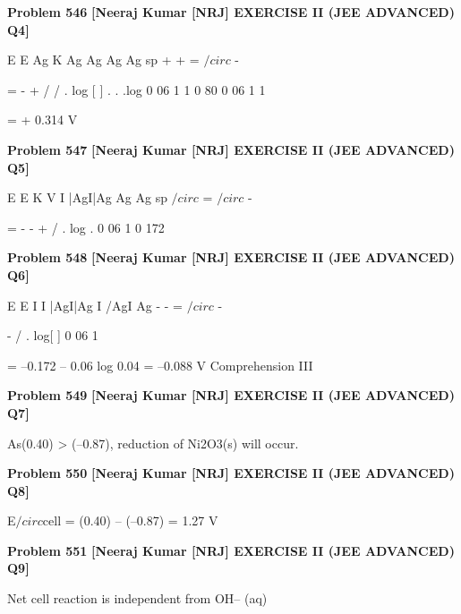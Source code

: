 \begin{problembox}
\textbf{Problem 546} \hfill \textbf{[Neeraj Kumar [NRJ] EXERCISE II (JEE ADVANCED) Q4]}
\label{q:ext-nrj_all_questions-546}

E
E
Ag
K
Ag
Ag
Ag
Ag
sp
+
+
=
$/circ$
-
 
=
-
+
/
/
.
log
[
]
.
.
.log
0 06
1
1
0 80
0 06
1
1
 
                = + 0.314 V
\end{problembox}

\begin{problembox}
\textbf{Problem 547} \hfill \textbf{[Neeraj Kumar [NRJ] EXERCISE II (JEE ADVANCED) Q5]}
\label{q:ext-nrj_all_questions-547}

E
E
K
V
I |AgI|Ag
Ag
Ag
sp
$/circ$
=
$/circ$
-
 
= -
-
+ /
.
log
.
0 06
1
0 172
\end{problembox}

\begin{problembox}
\textbf{Problem 548} \hfill \textbf{[Neeraj Kumar [NRJ] EXERCISE II (JEE ADVANCED) Q6]}
\label{q:ext-nrj_all_questions-548}

E
E
I
I |AgI|Ag
I /AgI Ag
-
-
=
$/circ$
-
 
-
/
.
log[
]
0 06
1
 
                   = --0.172 -- 0.06   log 0.04 = --0.088 V
Comprehension III
\end{problembox}

\begin{problembox}
\textbf{Problem 549} \hfill \textbf{[Neeraj Kumar [NRJ] EXERCISE II (JEE ADVANCED) Q7]}
\label{q:ext-nrj_all_questions-549}

As(0.40) > (--0.87), reduction of Ni2O3(s) will 
occur.
\end{problembox}

\begin{problembox}
\textbf{Problem 550} \hfill \textbf{[Neeraj Kumar [NRJ] EXERCISE II (JEE ADVANCED) Q8]}
\label{q:ext-nrj_all_questions-550}

E$/circ$cell = (0.40) -- (--0.87) = 1.27 V
\end{problembox}

\begin{problembox}
\textbf{Problem 551} \hfill \textbf{[Neeraj Kumar [NRJ] EXERCISE II (JEE ADVANCED) Q9]}
\label{q:ext-nrj_all_questions-551}

Net cell reaction is independent from OH-- (aq)
\end{problembox}

